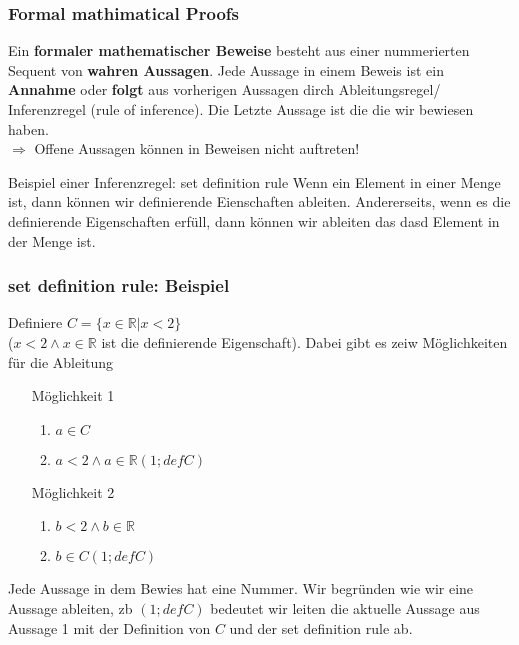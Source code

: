     \subsubsection{Formal mathimatical Proofs}
        Ein \textbf{formaler mathematischer Beweise} besteht aus einer nummerierten Sequent von \textbf{wahren Aussagen}. Jede Aussage in einem Beweis ist ein \textbf{Annahme} oder \textbf{folgt} aus vorherigen Aussagen dirch Ableitungsregel/ Inferenzregel (rule of inference). Die Letzte Aussage ist die die wir bewiesen haben.\\ $\Rightarrow$ Offene Aussagen können in Beweisen nicht auftreten!

        {
        Beispiel einer Inferenzregel: set definition rule
        }
        {
            Wenn ein Element in einer Menge ist, dann können wir definierende Eienschaften ableiten. Andererseits, wenn es die definierende Eigenschaften erfüll, dann können wir ableiten das dasd Element in der Menge ist.
        }
    \subsubsection{set definition rule: Beispiel}
        Definiere $C = \{x \in \mathbb{R}\vert x < 2\}$ \\ ($x < 2 \land x \in \mathbb{R}$ ist die definierende Eigenschaft). Dabei gibt es zeiw Möglichkeiten für die Ableitung 
        \begin{itemize}
            \item [Möglichkeit 1] 
            \begin{enumerate}
                \item $a \in C$
                \item $a < 2 \land a \in \mathbb{R} (1; def C)$
            \end{enumerate}
            \item [Möglichkeit 2] 
            \begin{enumerate}
                \item $b < 2 \land b \in \mathbb{R} $
                \item $b \in C (1; def C)$
            \end{enumerate}
        \end{itemize}
        Jede Aussage in dem Bewies hat eine Nummer. Wir begründen wie wir eine Aussage ableiten, zb $(1; def C)$ bedeutet wir leiten die aktuelle Aussage aus Aussage 1 mit der Definition von $C$ und der set definition rule ab.


